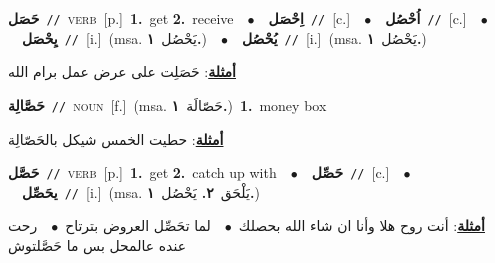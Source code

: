 \documentclass[10pt,a4paper,twoside]{article} %
\begin{document}
\begin{multicols}{2}
{\setlength\topsep{0pt}\textbf{\foreignlanguage{arabic}{حَصَل}}\ {\color{gray}\texttt{//}\color{black}}\ \textsc{verb}\ [p.]\ \textbf{1.}~get  \textbf{2.}~receive\ \ $\bullet$\ \ \setlength\topsep{0pt}\textbf{\foreignlanguage{arabic}{اِحْصَل}}\ {\color{gray}\texttt{//}\color{black}}\ [c.]\ \ $\bullet$\ \ \setlength\topsep{0pt}\textbf{\foreignlanguage{arabic}{اُحْصُل}}\ {\color{gray}\texttt{//}\color{black}}\ [c.]\ \ $\bullet$\ \ \setlength\topsep{0pt}\textbf{\foreignlanguage{arabic}{يِحْصَل}}\ {\color{gray}\texttt{//}\color{black}}\ [i.]\ \color{gray}(msa. \foreignlanguage{arabic}{يَحْصُل}~\foreignlanguage{arabic}{\textbf{١.}})\color{black}\ \ $\bullet$\ \ \setlength\topsep{0pt}\textbf{\foreignlanguage{arabic}{يُحْصُل}}\ {\color{gray}\texttt{//}\color{black}}\ [i.]\ \color{gray}(msa. \foreignlanguage{arabic}{يَحْصُل}~\foreignlanguage{arabic}{\textbf{١.}})\color{black}\  \begin{flushright}\color{gray}\foreignlanguage{arabic}{\textbf{\underline{\foreignlanguage{arabic}{أمثلة}}}: حَصَلِت على عرض عمل برام الله}\end{flushright}\color{black}} \vspace{2mm}

{\setlength\topsep{0pt}\textbf{\foreignlanguage{arabic}{حَصَّالِة}}\ {\color{gray}\texttt{//}\color{black}}\ \textsc{noun}\ [f.]\ \color{gray}(msa. \foreignlanguage{arabic}{حَصّالَة}~\foreignlanguage{arabic}{\textbf{١.}})\color{black}\ \textbf{1.}~money box\  \begin{flushright}\color{gray}\foreignlanguage{arabic}{\textbf{\underline{\foreignlanguage{arabic}{أمثلة}}}: حطيت الخمس شيكل بالحَصّالِة}\end{flushright}\color{black}} \vspace{2mm}

{\setlength\topsep{0pt}\textbf{\foreignlanguage{arabic}{حَصَّل}}\ {\color{gray}\texttt{//}\color{black}}\ \textsc{verb}\ [p.]\ \textbf{1.}~get  \textbf{2.}~catch up with\ \ $\bullet$\ \ \setlength\topsep{0pt}\textbf{\foreignlanguage{arabic}{حَصِّل}}\ {\color{gray}\texttt{//}\color{black}}\ [c.]\ \ $\bullet$\ \ \setlength\topsep{0pt}\textbf{\foreignlanguage{arabic}{يحَصِّل}}\ {\color{gray}\texttt{//}\color{black}}\ [i.]\ \color{gray}(msa. \foreignlanguage{arabic}{يَلْحَق}~\foreignlanguage{arabic}{\textbf{٢.}}  \foreignlanguage{arabic}{يَحْصُل}~\foreignlanguage{arabic}{\textbf{١.}})\color{black}\  \begin{flushright}\color{gray}\foreignlanguage{arabic}{\textbf{\underline{\foreignlanguage{arabic}{أمثلة}}}: أنت روح هلا وأنا ان شاء الله بحصلك\ $\bullet$\ \  لما تحَصِّل العروض بترتاح\ $\bullet$\ \  رحت عنده عالمحل بس ما حَصَّلتوش}\end{flushright}\color{black}} \vspace{2mm}


\end{multicols}
\end{document}
